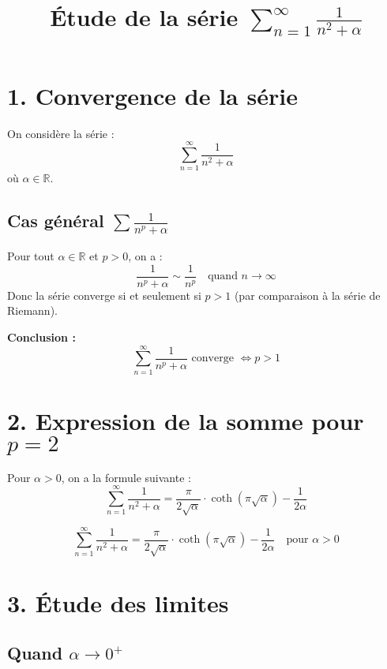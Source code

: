 \documentclass[a4paper,11pt]{article}
\title{Étude de la série \(\displaystyle \sum_{n=1}^{\infty} \frac{1}{n^2 + \alpha}\)}
\author{}
\date{}
\begin{document}
\maketitle

\section*{1. Convergence de la série}

On considère la série :
\[
\sum_{n=1}^{\infty} \frac{1}{n^2 + \alpha}
\]
où \( \alpha \in \mathbb{R} \). 

\subsection*{Cas général \(\displaystyle \sum \frac{1}{n^p + \alpha}\)}

Pour tout \( \alpha \in \mathbb{R} \) et \( p > 0 \), on a :
\[
\frac{1}{n^p + \alpha} \sim \frac{1}{n^p} \quad \text{quand } n \to \infty
\]
Donc la série converge si et seulement si \( p > 1 \) (par comparaison à la série de Riemann).

\medskip
\textbf{Conclusion :}
\[
\sum_{n=1}^{\infty} \frac{1}{n^p + \alpha} \text{ converge } \iff p > 1
\]

\section*{2. Expression de la somme pour \( p = 2 \)}

Pour \( \alpha > 0 \), on a la formule suivante :
\[
\sum_{n=1}^{\infty} \frac{1}{n^2 + \alpha}
= \frac{\pi}{2\sqrt{\alpha}} \cdot \coth(\pi \sqrt{\alpha}) - \frac{1}{2\alpha}
\]

\begin{tcolorbox}[colback=blue!5!white, colframe=blue!80!black, title=Formule à retenir]
\[
\boxed{
\sum_{n=1}^{\infty} \frac{1}{n^2 + \alpha}
=
\frac{\pi}{2\sqrt{\alpha}} \cdot \coth(\pi \sqrt{\alpha}) - \frac{1}{2\alpha}
\quad \text{pour } \alpha > 0
}
\]
\end{tcolorbox}

\section*{3. Étude des limites}

\subsection*{Quand \( \alpha \to 0^+ \)}
\end{document}
